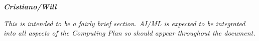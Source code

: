 \textbf{\emph{Cristiano/Will}}

\emph{This is intended to be a fairly brief section. AI/ML is expected to be integrated into all aspects of the Computing Plan so should appear throughout the document.}